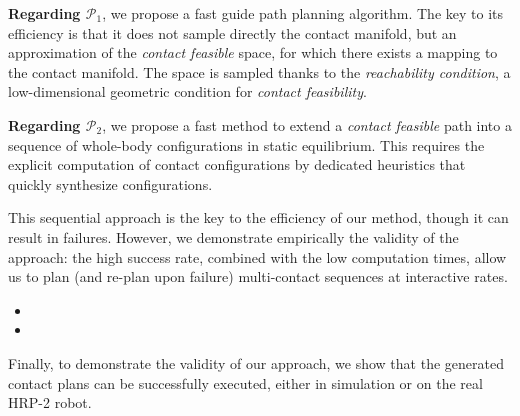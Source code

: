 \noindent \textbf{Regarding $\mathcal{P}_1$}, we propose a fast guide path planning algorithm. The key to its efficiency is that it does not sample
directly the contact manifold, but an approximation of the \textit{contact feasible} space, for which there exists a mapping to the contact manifold. 
The space is sampled thanks to the \textit{reachability condition}, a low-dimensional geometric condition for \textit{contact feasibility}.

\noindent \textbf{Regarding $\mathcal{P}_2$},  we propose a fast method to extend a \textit{contact feasible} path into a sequence of whole-body configurations in static equilibrium. This  requires the explicit computation of contact configurations by dedicated heuristics that quickly synthesize  configurations.

This sequential approach is the key to the efficiency of our method, though it
can result in failures. However, we demonstrate empirically the validity of the approach: the high success rate, combined with the low computation times, allow us to plan (and re-plan upon failure) multi-contact sequences at \gls{interactive} rates.

\begin{itemize}
\item {}
\item {}
\end{itemize}

Finally, to demonstrate the validity of our approach, we show that the generated contact plans can be successfully executed, either in simulation or on the real HRP-2 robot.


